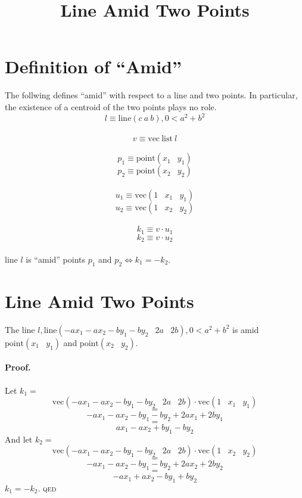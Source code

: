 \documentclass{article}
\title{Line Amid Two Points}
\begin{document}
\newcommand{\en}{\phantom{N}}
\maketitle
\section{Definition of ``Amid''}
The follwing defines ``amid'' with respect to a line and two points.
In particular, the existence of a centroid of the two points plays no role.
$$l\equiv \mathrm{line}(c\ a\ b), 0<a^2+b^2$$
\en\\
$$v\equiv \mathrm{vec\ list}\ l$$
\en\\
$$p_1\equiv \mathrm{point}(x_1\en y_1)$$
$$p_2\equiv \mathrm{point}(x_2\en y_2)$$
\en\\
$$u_1\equiv \mathrm{vec}(1\en x_1\en y_1)$$
$$u_2\equiv \mathrm{vec}(1\en x_2\en y_2)$$
\en\\
$$k_1\equiv v\cdot u_1$$
$$k_2\equiv v\cdot u_2$$
\en\\
line $l$ is ``amid'' points $p_1$ and $p_2\Leftrightarrow k_1=-k_2$.
\newpage
\section{Line Amid Two Points}
The line $l, \mathrm{line}(-ax_1-ax_2-by_1-by_2\en 2a\en2b), 0<a^2+b^2$ is amid
$\mathrm{point}(x_1\en y_1)$ and
$\mathrm{point}(x_2\en y_2)$.

\paragraph{Proof.}
Let $k_1=$
$$\mathrm{vec}(-ax_1-ax_2-by_1-by_2\en 2a\en2b)\cdot \mathrm{vec}(1\en x_1\en y_1)$$
$$=$$
$$-ax_1-ax_2-by_1-by_2+2ax_1+2by_1$$
$$=$$
$$ax_1-ax_2+by_1-by_2$$
And let $k_2=$
$$\mathrm{vec}(-ax_1-ax_2-by_1-by_2\en 2a\en2b)\cdot \mathrm{vec}(1\en x_2\en y_2)$$
$$=$$
$$-ax_1-ax_2-by_1-by_2+2ax_2+2by_2$$
$$=$$
$$-ax_1+ax_2-by_1+by_2$$
$k_1=-k_2$. \textsc{qed}
\end{document}
